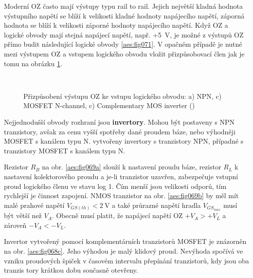 
    Moderní OZ často mají výstupy typu rail to rail. Jejich největší kladná hodnota výstupního
    napětí se blíží k velikosti kladné hodnoty napájecího napětí, záporná hodnota se blíží k
    velikosti záporné hodnoty napájecího napětí. Když OZ a logické obvody mají stejná napájecí
    napětí, např. +\qty{5}{\volt}, je možné z výstupů OZ přímo budit následující logické obvody
    \ref{aes:fig071}. V opačném případě je nutné mezi výstupem OZ a vstupem logického obvodu vložit
    přizpůsobovací člen \cite[s.~2]{AN849} jak je tomu na obrázku \ref{aes:fig069}.
    

    \begin{figure}[ht!]  %
      \centering
         \\
      \caption{Přizpůsobení výstupu OZ ke vstupu logického obvodu: a) NPN, c) MOSFET N-channel, c)
                Complementary MOS inverter (\cite[s.~2]{AN849})}
      \label{aes:fig069}
    \end{figure}

    Nejjednodušší obvody rozhraní jsou \textbf{invertory}. Mohou být postaveny s NPN tranzistory,
    avšak za cenu vyšší spotřeby dané proudem báze, nebo výhodněji MOSFET s kanálem typu N.
    vytvořeny invertory s tranzistory NPN, případné s tranzistory MOSFET s kanálem typu N. 
    
    Rezistor \(R_B\) na obr. \ref{aes:fig069a} slouží k nastavení proudu báze, rezistor \(R_L\) k
    nastavení kolektorového proudu a je-li tranzistor uzavřen, zabezpečuje vstupní proud logického
    členu ve stavu log 1. Čím menší jsou velikosti odporů, tím rychlejší je činnost zapojení. NMOS
    tranzistor na obr. \ref{aes:fig069b} by měl mít malé prahové napětí \(V_{GS(th)}
    <\qty{2}{\volt}\) a také průrazné napětí hradla \(V_{GS_{max}}\) musí být větší než \(V_A\).
    Obecně musí platit, že napájecí napětí OZ \(+V_A > +V_L\) a zároveň \(-V_A < -V_L\).

    Invertor vytvořený pomocí komplementárních tranzistorů MOSFET je znázorněn na obr.
    \ref{aes:fig068c}. Jeho výhodou je malý klidový proud. Nevýhoda spočívá ve vzniku proudových
    špiček v časovém intervalu přepínání tranzistorů, kdy jsou oba tranzis tory krátkou dobu
    současně otevřeny.

